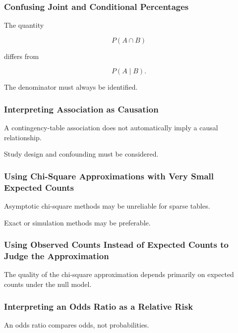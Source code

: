 \subsubsection{Confusing Joint and Conditional Percentages}

The quantity

\[
P(A\cap B)
\]

differs from

\[
P(A\mid B).
\]

The denominator must always be identified.

\subsubsection{Interpreting Association as Causation}

A contingency-table association does not automatically imply a causal
relationship.

Study design and confounding must be considered.

\subsubsection{Using Chi-Square Approximations with Very Small Expected Counts}

Asymptotic chi-square methods may be unreliable for sparse tables.

Exact or simulation methods may be preferable.

\subsubsection{Using Observed Counts Instead of Expected Counts to Judge the Approximation}

The quality of the chi-square approximation depends primarily on
expected counts under the null model.

\subsubsection{Interpreting an Odds Ratio as a Relative Risk}

An odds ratio compares odds, not probabilities.

